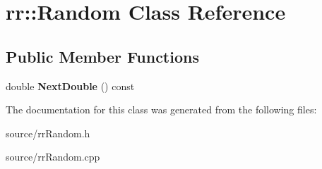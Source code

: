 \hypertarget{classrr_1_1_random}{\section{rr\-:\-:Random Class Reference}
\label{classrr_1_1_random}
}
\subsection*{Public Member Functions}
\begin{DoxyCompactItemize}
\item 
\hypertarget{classrr_1_1_random_ae0b4cc1a4b441111214c569fe6ca8950}{double {\bfseries Next\-Double} () const }\label{classrr_1_1_random_ae0b4cc1a4b441111214c569fe6ca8950}

\end{DoxyCompactItemize}


The documentation for this class was generated from the following files\-:\begin{DoxyCompactItemize}
\item 
source/rr\-Random.\-h\item 
source/rr\-Random.\-cpp\end{DoxyCompactItemize}
